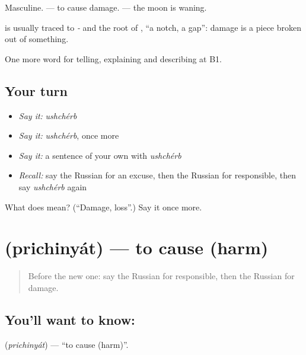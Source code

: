 Masculine. \emph{ } — to cause damage. \emph{  } — the moon is waning.

\begin{cousinweb}
\textbf{} is usually traced to \emph{-} and the root of \emph{}, \emph{} \textquotedblleft{}a notch, a gap\textquotedblright{}: damage is a piece broken out of something.
\end{cousinweb}

\begin{grammarlens}[title={What you've built}]
One more word for telling, explaining and describing at B1.
\end{grammarlens}

\subsection*{Your turn}
\begin{itemize}
\raggedright
  \item \emph{Say it:} \emph{ushchérb}
  \item \emph{Say it:} \emph{ushchérb}, once more
  \item \emph{Say it:} a sentence of your own with \emph{ushchérb}
  \item \emph{Recall:} say the Russian for an excuse, then the Russian for responsible, then say \emph{ushchérb} again
\end{itemize}

\begin{tcolorbox}[breakable,colback=teal!4,colframe=teal!35!black,title={Before you move on}]
What does  mean? (\textquotedblleft{}Damage, loss\textquotedblright{}.) Say it once more.
\end{tcolorbox}
\section[\texorpdfstring{\ru{причинять} (prichinyát)}{причинять (prichinyát)}]{ (prichinyát) — to cause (harm)}

\label{lesson:RU-C353-prichinyat}



\begin{quote}
Before the new one: say the Russian for responsible, then the Russian for damage.
\end{quote}

\subsection*{You'll want to know: }
\textbf{} (\emph{prichinyát}) — \textquotedblleft{}to cause (harm)\textquotedblright{}.

